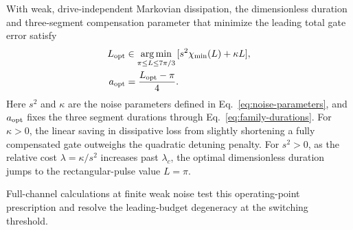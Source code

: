 \documentclass[12pt]{iopjournal}
\begin{document}
With weak,
drive-independent Markovian dissipation, the dimensionless duration
and three-segment compensation parameter that minimize the leading
total gate error satisfy
\begin{equation*}
\begin{aligned}
 L_{\rm opt}&\in\underset{\pi\le L\le7\pi/3}{\arg\min}\,
 [s^2\chi_{\min}(L)+\kappa L],\\
 a_{\rm opt}&=\frac{L_{\rm opt}-\pi}{4}.
\end{aligned}
\end{equation*}
Here $s^2$ and $\kappa$ are the noise parameters defined in
Eq.~\eqref{eq:noise-parameters}, and $a_{\rm opt}$ fixes the three
segment durations through Eq.~\eqref{eq:family-durations}. For $\kappa>0$,
the linear saving in dissipative loss from slightly shortening a fully
compensated gate outweighs the quadratic detuning penalty. For $s^2>0$,
as the relative cost $\lambda=\kappa/s^2$ increases past $\lambda_c$,
the optimal dimensionless duration jumps to the rectangular-pulse
value $L=\pi$.

Full-channel calculations at finite weak noise test this operating-point
prescription and resolve the leading-budget degeneracy at the switching
threshold.




\end{document}
